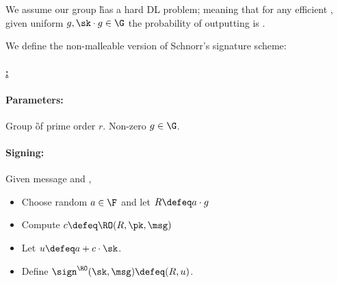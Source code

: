 \documentclass[11pt]{article}
\numberwithin{equation}{section} %
\numberwithin{figure}{section} %
\newtheorem{claim}[thm]{Claim}
\newcommand{\set}[1]{\ensuremath{\left\{#1\right\}}\xspace}
\newcommand{\eps}{\ensuremath{\epsilon}\xspace}
\begin{document}
% 
% 
% 
% 
 
 
 
 
 We assume our group \G has a hard DL problem; meaning that for any efficient \adv,
 given uniform $g,\sk\cdot g \in \G$ the probability of outputting \sk is \negl.
 
 We define the non-malleable version of Schnorr's signature scheme:
 
\paragraph{\underline{\schnorr:}} 
 \paragraph{Parameters:}
 Group \G of prime order $r$. Non-zero $g\in \G$.
 \paragraph{Signing:}
  Given message \msg and \sk, 
 \begin{itemize}
 \item Choose random $a\in \F$ and let $R\defeq a\cdot g$

  \item Compute $c\defeq \RO(R,\pk,\msg)$
  \item Let $u\defeq a+c\cdot \sk$.
  \item Define $\sign^{\RO}(\sk,\msg) \defeq (R,u)$.
 \end{itemize}
\end{document}
